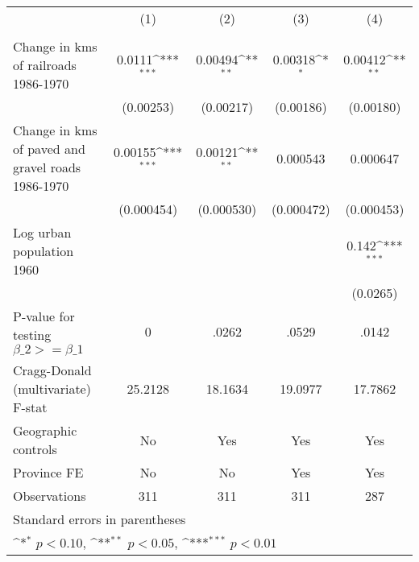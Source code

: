 {
\def\sym#1{\ifmmode^{#1}\else\(^{#1}\)\fi}
\begin{tabular}{l*{4}{c}}
\hline\hline
                &\multicolumn{1}{c}{(1)}&\multicolumn{1}{c}{(2)}&\multicolumn{1}{c}{(3)}&\multicolumn{1}{c}{(4)}\\
                &\multicolumn{1}{c}{}&\multicolumn{1}{c}{}&\multicolumn{1}{c}{}&\multicolumn{1}{c}{}\\
\hline
Change in kms of railroads 1986-1970&   0.0111\sym{***}&  0.00494\sym{**} &  0.00318\sym{*}  &  0.00412\sym{**} \\
                &(0.00253)         &(0.00217)         &(0.00186)         &(0.00180)         \\
[1em]
Change in kms of paved and gravel roads 1986-1970&  0.00155\sym{***}&  0.00121\sym{**} & 0.000543         & 0.000647         \\
                &(0.000454)         &(0.000530)         &(0.000472)         &(0.000453)         \\
[1em]
Log urban population 1960&                  &                  &                  &    0.142\sym{***}\\
                &                  &                  &                  & (0.0265)         \\
\hline
P-value for testing $\beta\_{2} >= \beta\_{1}$&        0         &    .0262         &    .0529         &    .0142         \\
Cragg-Donald (multivariate) F-stat&  25.2128         &  18.1634         &  19.0977         &  17.7862         \\
Geographic controls&       No         &      Yes         &      Yes         &      Yes         \\
Province FE     &       No         &       No         &      Yes         &      Yes         \\
Observations    &      311         &      311         &      311         &      287         \\
\hline\hline
\multicolumn{5}{l}{\footnotesize Standard errors in parentheses}\\
\multicolumn{5}{l}{\footnotesize \sym{*} \(p<0.10\), \sym{**} \(p<0.05\), \sym{***} \(p<0.01\)}\\
\end{tabular}
}
